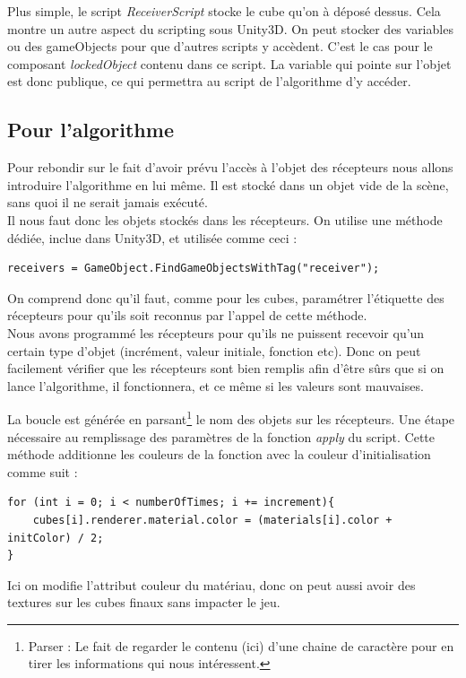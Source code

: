 \documentclass[a4paper,11pt]{myreport}
\begin{document}
	\par Plus simple, le script \textit{ReceiverScript} stocke le cube qu'on à déposé dessus. Cela montre un autre aspect du scripting sous Unity3D. On peut stocker des variables ou des gameObjects pour que d'autres scripts y accèdent. C'est le cas pour le composant  \textit{ lockedObject } contenu dans ce script. La variable qui pointe sur l'objet est donc publique, ce qui permettra au script de l'algorithme d'y accéder.
	\subsection{Pour l'algorithme}
	\par Pour rebondir sur le fait d'avoir prévu l'accès à l'objet des récepteurs nous allons introduire l'algorithme en lui même. Il est stocké dans un objet vide de la scène, sans quoi il ne serait jamais exécuté.\\
	Il nous faut donc les objets stockés dans les récepteurs. On utilise une méthode dédiée, inclue dans Unity3D, et utilisée comme ceci :
	\lstset{style=sharpc}
	\begin{lstlisting}
receivers = GameObject.FindGameObjectsWithTag("receiver");
	\end{lstlisting}
	\par On comprend donc qu'il faut, comme pour les cubes, paramétrer l'étiquette des récepteurs pour qu'ils soit reconnus par l'appel de cette méthode.\\
	Nous avons programmé les récepteurs pour qu'ils ne puissent recevoir qu'un certain type d'objet (incrément, valeur initiale, fonction etc). Donc on peut facilement vérifier que les récepteurs sont bien remplis afin d'être sûrs que si on lance l'algorithme, il fonctionnera, et ce même si les valeurs sont mauvaises.
	
	La boucle est générée en parsant\footnote{Parser : Le fait de regarder le contenu (ici) d'une chaine de caractère pour en tirer les informations qui nous intéressent.} le nom des objets sur les récepteurs. Une étape nécessaire au remplissage des paramètres de la fonction \textit{apply} du script. Cette méthode additionne les couleurs de la fonction avec la couleur d'initialisation comme suit : 
	\lstset{style=sharpc}
	\begin{lstlisting}
for (int i = 0; i < numberOfTimes; i += increment){
	cubes[i].renderer.material.color = (materials[i].color + initColor) / 2;
}
	\end{lstlisting}
	\par Ici on modifie l'attribut couleur du matériau, donc on peut aussi avoir des textures sur les cubes finaux sans impacter le jeu. 
	
\end{document}
